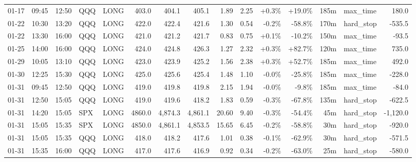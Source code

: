 \documentclass[11pt,a4paper,twoside]{article}
\begin{document}
\begin{landscape}
\begin{center}
\begin{longtable}{>{\color{txtmain}}l l l l l r r r r r r r r >{\color{txtmain}}l r}
01-17 & 09:45 & 12:50 & QQQ & LONG & 403.0 & 404.1 & 405.1 & 1.89 & 2.25 & \textcolor{wingreen}{+0.3\%} & \textcolor{wingreen}{+19.0\%} & 185m & max\_time & \textcolor{wingreen}{180.0} \\
01-22 & 10:30 & 13:20 & QQQ & LONG & 422.0 & 422.4 & 421.6 & 1.30 & 0.54 & \textcolor{lossred}{-0.2\%} & \textcolor{lossred}{-58.8\%} & 170m & hard\_stop & \textcolor{lossred}{-535.5} \\
01-22 & 13:30 & 16:00 & QQQ & LONG & 421.0 & 421.2 & 421.7 & 0.83 & 0.75 & \textcolor{wingreen}{+0.1\%} & \textcolor{lossred}{-10.2\%} & 150m & max\_time & \textcolor{lossred}{-93.5} \\
01-25 & 14:00 & 16:00 & QQQ & LONG & 424.0 & 424.8 & 426.3 & 1.27 & 2.32 & \textcolor{wingreen}{+0.3\%} & \textcolor{wingreen}{+82.7\%} & 120m & max\_time & \textcolor{wingreen}{735.0} \\
01-29 & 10:05 & 13:10 & QQQ & LONG & 423.0 & 423.9 & 425.2 & 1.56 & 2.38 & \textcolor{wingreen}{+0.3\%} & \textcolor{wingreen}{+52.7\%} & 185m & max\_time & \textcolor{wingreen}{492.0} \\
01-30 & 12:25 & 15:30 & QQQ & LONG & 425.0 & 425.6 & 425.4 & 1.48 & 1.10 & \textcolor{lossred}{-0.0\%} & \textcolor{lossred}{-25.8\%} & 185m & max\_time & \textcolor{lossred}{-228.0} \\
01-31 & 09:45 & 12:50 & QQQ & LONG & 419.0 & 419.8 & 419.8 & 2.15 & 1.94 & \textcolor{lossred}{-0.0\%} & \textcolor{lossred}{-9.8\%} & 185m & max\_time & \textcolor{lossred}{-84.0} \\
01-31 & 12:50 & 15:05 & QQQ & LONG & 419.0 & 419.6 & 418.2 & 1.83 & 0.59 & \textcolor{lossred}{-0.3\%} & \textcolor{lossred}{-67.8\%} & 135m & hard\_stop & \textcolor{lossred}{-622.5} \\
01-31 & 14:20 & 15:05 & SPX & LONG & 4860.0 & 4,874.3 & 4,861.1 & 20.60 & 9.40 & \textcolor{lossred}{-0.3\%} & \textcolor{lossred}{-54.4\%} & 45m & hard\_stop & \textcolor{lossred}{-1,120.0} \\
01-31 & 15:05 & 15:35 & SPX & LONG & 4850.0 & 4,861.1 & 4,853.5 & 15.65 & 6.45 & \textcolor{lossred}{-0.2\%} & \textcolor{lossred}{-58.8\%} & 30m & hard\_stop & \textcolor{lossred}{-920.0} \\
01-31 & 15:05 & 15:35 & QQQ & LONG & 418.0 & 418.2 & 417.6 & 1.01 & 0.38 & \textcolor{lossred}{-0.1\%} & \textcolor{lossred}{-62.9\%} & 30m & hard\_stop & \textcolor{lossred}{-571.5} \\
01-31 & 15:35 & 16:00 & QQQ & LONG & 417.0 & 417.6 & 416.9 & 0.92 & 0.34 & \textcolor{lossred}{-0.2\%} & \textcolor{lossred}{-63.0\%} & 25m & hard\_stop & \textcolor{lossred}{-580.0} \\

\end{longtable}
\end{center}
\end{landscape}
\end{document}
